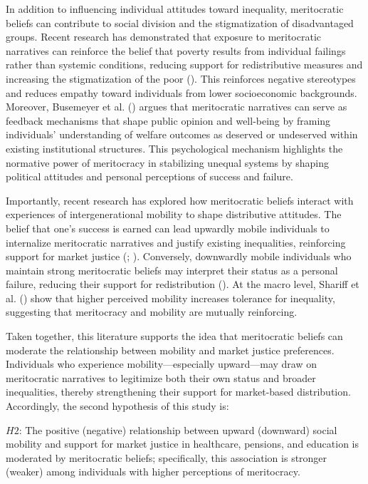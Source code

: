 \documentclass[
  13pt,
]{article}
\begin{document}
In addition to influencing individual attitudes toward inequality,
meritocratic beliefs can contribute to social division and the
stigmatization of disadvantaged groups. Recent research has demonstrated
that exposure to meritocratic narratives can reinforce the belief that
poverty results from individual failings rather than systemic
conditions, reducing support for redistributive measures and increasing
the stigmatization of the poor (). This reinforces negative stereotypes and reduces empathy
toward individuals from lower socioeconomic backgrounds. Moreover,
Busemeyer et al. () argues
that meritocratic narratives can serve as feedback mechanisms that shape
public opinion and well-being by framing individuals' understanding of
welfare outcomes as deserved or undeserved within existing institutional
structures. This psychological mechanism highlights the normative power
of meritocracy in stabilizing unequal systems by shaping political
attitudes and personal perceptions of success and failure.

Importantly, recent research has explored how meritocratic beliefs
interact with experiences of intergenerational mobility to shape
distributive attitudes. The belief that one's success is earned can lead
upwardly mobile individuals to internalize meritocratic narratives and
justify existing inequalities, reinforcing support for market justice
(;
). Conversely,
downwardly mobile individuals who maintain strong meritocratic beliefs
may interpret their status as a personal failure, reducing their support
for redistribution ().
At the macro level, Shariff et al.
() show that higher perceived
mobility increases tolerance for inequality, suggesting that meritocracy
and mobility are mutually reinforcing.

Taken together, this literature supports the idea that meritocratic
beliefs can moderate the relationship between mobility and market
justice preferences. Individuals who experience mobility---especially
upward---may draw on meritocratic narratives to legitimize both their
own status and broader inequalities, thereby strengthening their support
for market-based distribution. Accordingly, the second hypothesis of
this study is:

\(H2\): The positive (negative) relationship between upward (downward)
social mobility and support for market justice in healthcare, pensions,
and education is moderated by meritocratic beliefs; specifically, this
association is stronger (weaker) among individuals with higher
perceptions of meritocracy.
\end{document}
